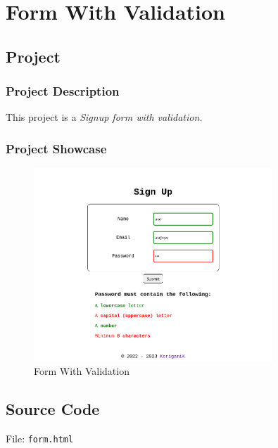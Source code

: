\section{Form With Validation}\label{sec:form}

\subsection{Project}

\subsubsection*{Project Description}

This project is a \textit{Signup form with validation.}

\subsubsection*{Project Showcase}
\begin{figure}[H]
    \centering
    \includegraphics[width=0.8\textwidth]{res/form.png}
    \caption{Form With Validation}
    \label{fig:form}
\end{figure}

\subsection{Source Code}

File: \texttt{form.html}
